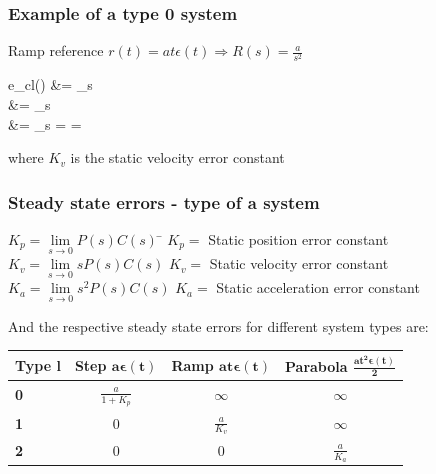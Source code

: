 \begin{frame}
	\frametitle{Example of a type 0 system}
		\begin{example}
			{Ramp reference $r(t) = at \epsilon (t) \Rightarrow R(s) = \frac{a}{s^2}$}
			\begin{flalign*}
				e_{cl}(\infty) &= \lim\limits_{s }   \\
				&= \lim\limits_{s }   \\
				&= \lim\limits_{s }  =  = \infty
			\end{flalign*}
			where $K_v$ is the static velocity error constant
		\end{example}
\end{frame}	

\begin{frame}
	\frametitle{Steady state errors - type of a system}
	\begin{block}{}
			\begin{tabbing}
			$K_p = \lim\limits_{s \rightarrow 0} P(s)C(s)$ 
			\hspace{2em} \= $K_p = $ Static position error constant \\
			$K_v = \lim\limits_{s \rightarrow 0}s P(s)C(s)$ \> $K_v = $ Static velocity error constant \\
			$K_a = \lim\limits_{s \rightarrow 0}s^2 P(s)C(s)$ \> $K_a = $ Static acceleration error constant
			\end{tabbing}
		\end{block}
	\begin{alertblock}{}
		And the respective steady state errors for different system types are: \\
		\vspace{1em}
		\centering
		\begin{tabular}{|l|c|c|c|}
			\hline \textbf{Type} $\mathbf{l}$ & \textbf{Step} $\mathbf{a \boldsymbol{\epsilon} (t)}$ & \textbf{Ramp} $\mathbf{at \boldsymbol{\epsilon} (t)}$ & \textbf{Parabola} $\mathbf{\frac{at^2 \boldsymbol{\epsilon} (t)}{2}}$ \\ 
			\hline \textbf{0} & $\frac{a}{1 + K_p}$ & $\infty$ & $\infty$ \\ 
			\hline \textbf{1} & 0 & $\frac{a}{K_v}$ & $\infty$ \\ 
			\hline \textbf{2} & 0 & 0 & $\frac{a}{K_a}$ \\ 
			\hline 
		\end{tabular} 
	\end{alertblock}
\end{frame}


